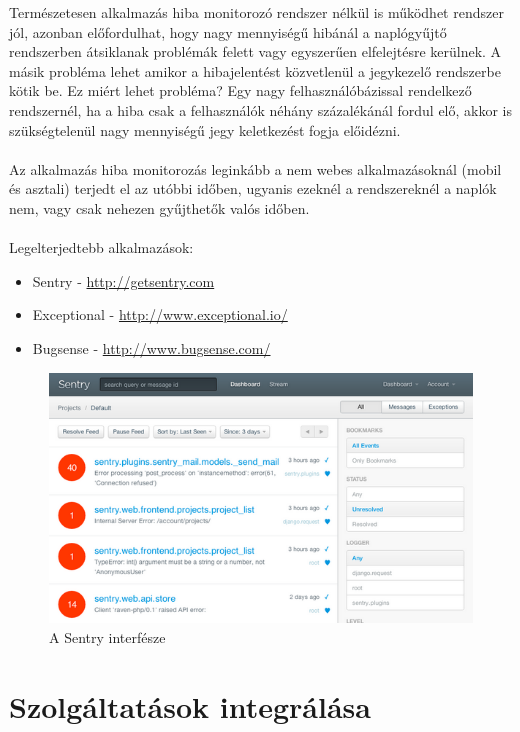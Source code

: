 Természetesen alkalmazás hiba monitorozó rendszer nélkül is működhet rendszer jól, azonban előfordulhat, hogy nagy mennyiségű hibánál a naplógyűjtő rendszerben átsiklanak problémák felett vagy egyszerűen elfelejtésre kerülnek. A másik probléma lehet amikor a hibajelentést közvetlenül a jegykezelő rendszerbe kötik be. Ez miért lehet probléma? Egy nagy felhasználóbázissal rendelkező rendszernél, ha a hiba csak a felhasználók néhány százalékánál fordul elő, akkor is szükségtelenül nagy mennyiségű jegy keletkezést fogja előidézni.\\
\hfill\\
Az alkalmazás hiba monitorozás leginkább a nem webes alkalmazásoknál (mobil és asztali) terjedt el az utóbbi időben, ugyanis ezeknél a rendszereknél a naplók nem, vagy csak nehezen gyűjthetők valós időben.\\
\hfill\\
Legelterjedtebb alkalmazások:
\begin{itemize}
\item Sentry - \url{http://getsentry.com}
\item Exceptional - \url{http://www.exceptional.io/}
\item Bugsense - \url{http://www.bugsense.com/}
\end{itemize}

\begin{figure}[ht]
	\centering
		\includegraphics[scale=1]{assets/sentry.png}%
		\caption[DUMMY]%
		{A Sentry interfésze}%
		\label{fig:sentry}
\end{figure}

\section{Szolgáltatások integrálása\\}

